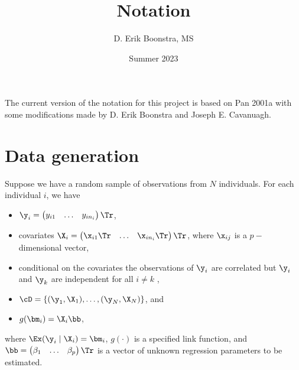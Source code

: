 \documentclass{article}
\title{Notation}
\author{D. Erik Boonstra, MS}
\date{Summer 2023}
\begin{document}
\maketitle

\noindent The current version of the notation for this project is based on Pan 2001a with some modifications made by D. Erik Boonstra and Joseph E. Cavanuagh. 

\section*{Data generation}
\noindent Suppose we have a random sample of observations from $N$ individuals. For each individual $i$, we have
\begin{itemize}
  \item $\y_{i} = \begin{pmatrix}
    y_{i1} & \ldots & y_{in_{i}}
  \end{pmatrix}\Tr$,
  \item covariates $\X_{i} = \begin{pmatrix}
    \x_{i1}\Tr & \ldots & \x_{in_{i}}\Tr
  \end{pmatrix}\Tr$, where $\x_{ij}$ is a $p-$dimensional vector,
  \item conditional on the covariates the observations of $\y_{i}$ are correlated but $\y_{i}$ and $\y_{k}$ are independent for all $i \neq k$ ,
  \item $\cD = \left\{(\y_{1}, \X_{1}), \ldots, (\y_{N}, \X_{N})\right\}$, and
  \item $g(\bm_{i}) = \X_{i}\bb$,
\end{itemize}
where $\Ex(\y_{i}\mid\X_{i}) = \bm_{i}$, $g(\cdot)$ is a specified link function, and $\bb = \begin{pmatrix}
  \beta_{1} & \ldots & \beta_{p}
\end{pmatrix}\Tr$ is a vector of unknown regression parameters to be estimated.
\end{document}
